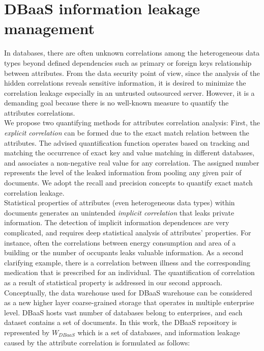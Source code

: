 \section{DBaaS information leakage management}
\label{LeakagePreventionSection}
In databases, there are often unknown correlations among the heterogeneous data types beyond defined dependencies such as primary or foreign keys relationship between attributes. From the data security point of view, since the analysis of the hidden correlations reveals sensitive information, it is desired to minimize the correlation leakage especially in an untrusted outsourced server. However, it is a demanding goal because there is no well-known measure to quantify the attributes correlations.\\

We propose two quantifying methods for attributes correlation analysis: First, the \emph{explicit correlation} can be formed due to the exact match relation between the attributes. The advised quantification function operates based on tracking and matching the occurrence of exact key and value matching in different databases, and associates a non-negative real value for any correlation. The assigned number represents the level of the leaked information from pooling any given pair of documents. We adopt the recall and precision concepts to quantify exact match correlation leakage.\\ 


Statistical properties of attributes (even heterogeneous data types) within documents generates an unintended \emph{implicit correlation} that leaks private information. The detection of implicit information dependences are very complicated, and requires deep statistical analysis of attributes' properties. For instance, often the correlations between energy consumption and area of a building or the number of occupants leaks valuable information. As a second clarifying example, there is a correlation between illness and the corresponding medication that is prescribed for an individual. The quantification of correlation as a result of statistical property is addressed in our second approach.\\


Conceptually, the data warehouse used for DBaaS warehouse can be considered as a new higher layer coarse-grained storage that operates in multiple enterprise level. DBaaS hosts vast number of databases belong to enterprises, and each dataset contains a set of documents. In this work, the DBaaS repository is represented by $W_{DBaaS}$ which is a set of databases, and information leakage caused by the attribute correlation is formulated as follows:

